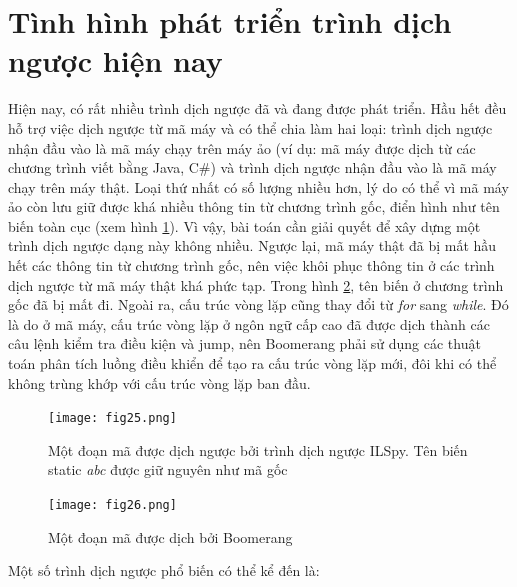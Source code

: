 \section{Tình hình phát triển trình dịch ngược hiện nay}
\label{sec:whyboom}
Hiện nay, có rất nhiều trình dịch ngược đã và đang được phát triển. Hầu hết đều hỗ trợ việc dịch ngược từ mã máy và có thể chia làm hai loại: trình dịch ngược nhận đầu vào là mã máy chạy trên máy ảo (ví dụ: mã máy được dịch từ các chương trình viết bằng Java, C\#) và trình dịch ngược nhận đầu vào là mã máy chạy trên máy thật. \cite{decompilersi} Loại thứ nhất có số lượng nhiều hơn, lý do có thể vì mã máy ảo còn lưu giữ được khá nhiều thông tin từ chương trình gốc, điển hình như tên biến toàn cục (xem hình \ref{fig:ilspy}). Vì vậy, bài toán cần giải quyết để xây dựng một trình dịch ngược dạng này không nhiều. Ngược lại, mã máy thật đã bị mất hầu hết các thông tin từ chương trình gốc, nên việc khôi phục thông tin ở các trình dịch ngược từ mã máy thật khá phức tạp. Trong hình \ref{fig:boomerang}, tên biến ở chương trình gốc đã bị mất đi. Ngoài ra, cấu trúc vòng lặp cũng thay đổi từ \textit{for} sang \textit{while}. Đó là do ở mã máy, cấu trúc vòng lặp ở ngôn ngữ cấp cao đã được dịch thành các câu lệnh kiểm tra điều kiện và jump, nên Boomerang phải sử dụng các thuật toán phân tích luồng điều khiển để tạo ra cấu trúc vòng lặp mới, đôi khi có thể không trùng khớp với cấu trúc vòng lặp ban đầu.

\begin{figure}[h]
	\centering
	\texttt{[image: fig25.png]}
	\caption{Một đoạn mã được dịch ngược bởi trình dịch ngược ILSpy. Tên biến static \textit{abc} được giữ nguyên như mã gốc}
	\label{fig:ilspy}
\end{figure}
\begin{figure}[h]
	\centering
	\texttt{[image: fig26.png]}
	\caption{Một đoạn mã được dịch bởi Boomerang}
	\label{fig:boomerang}
\end{figure}

Một số trình dịch ngược phổ biến có thể kể đến là:

